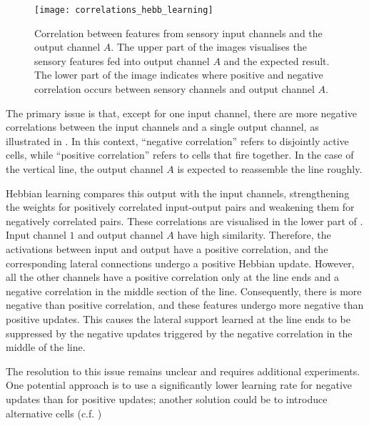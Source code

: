 \begin{figure}[h]
    \centering
    \texttt{[image: correlations\_hebb\_learning]}
    \caption[Feature correlation analysis]{Correlation between features from sensory input channels and the output channel $A$. The upper part of the images visualises the sensory features fed into output channel $A$ and the expected result. The lower part of the image indicates where positive and negative correlation occurs between sensory channels and output channel $A$.}
\end{figure}
%
The primary issue is that, except for one input channel, there are more negative correlations between the input channels and a single output channel, as illustrated in .
In this context, ``negative correlation'' refers to disjointly active cells, while ``positive correlation'' refers to cells that fire together.
In the case of the vertical line, the output channel $A$ is expected to reassemble the line roughly.

Hebbian learning compares this output with the input channels, strengthening the weights for positively correlated input-output pairs and weakening them for negatively correlated pairs.
These correlations are visualised in the lower part of .
Input channel $1$ and output channel $A$ have high similarity. Therefore, the activations between input and output have a positive correlation, and the corresponding lateral connections undergo a positive Hebbian update.
However, all the other channels have a positive correlation only at the line ends and a negative correlation in the middle section of the line.
Consequently, there is more negative than positive correlation, and these features undergo more negative than positive updates.
This causes the lateral support learned at the line ends to be suppressed by the negative updates triggered by the negative correlation in the middle of the line.

The resolution to this issue remains unclear and requires additional experiments. One potential approach is to use a significantly lower learning rate for negative updates than for positive updates; another solution could be to introduce alternative cells (c.f. )


